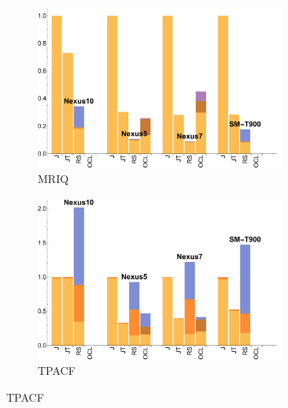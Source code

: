 \begin{figure}[t]
  \begin{subfigure}[b]{0.5\textwidth}
      \centering
      \includegraphics[width=0.9\textwidth]{data/Mriq_onecompute_time.pdf}
      \caption{MRIQ}
      \label{fig:MRIQ}
  \end{subfigure}
  \begin{subfigure}[b]{0.5\textwidth}
      \centering
      \includegraphics[width=0.9\textwidth]{data/Tpacf_onecompute_time.pdf}
      \caption{TPACF}
      \label{fig:TPACF}
  \end{subfigure}


\end{figure}
